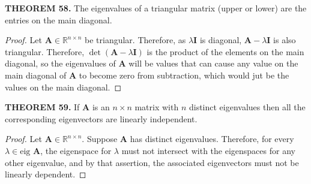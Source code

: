 \documentclass[12pt]{article}
\newcommand{\mat}[1]{\mathbf{#1}}
\newcommand{\theorem}[2]{\textbf{THEOREM #1.} #2}
\newcommand{\eig}{\text{eig }}
\begin{document}
\theorem{58}{The eigenvalues of a triangular matrix (upper or lower) are the entries on the main diagonal.}

\begin{proof}
Let $\mat{A} \in \mathbb{R}^{n \times n}$ be triangular. Therefore, as $\lambda \mat{I}$ is diagonal, $\mat{A} - \lambda \mat{I}$ is also triangular. Therefore, $\det(\mat{A} - \lambda \mat{I})$ is the product of the elements on the main diagonal, so the eigenvalues of $\mat{A}$ will be values that can cause any value on the main diagonal of $\mat{A}$ to become zero from subtraction, which would jut be the values on the main diagonal.   
\end{proof}

\theorem{59}{If $\mat{A}$ is an $n \times n$ matrix with $n$ distinct eigenvalues then all the corresponding eigenvectors are linearly independent.}

\begin{proof}
Let $\mat{A} \in \mathbb{R}^{n \times n}$. Suppose $\mat{A}$ has distinct eigenvalues. Therefore, for every $\lambda \in \eig \mat{A}$, the eigenspace for $\lambda$ must not intersect with the eigenspaces for any other eigenvalue, and by that assertion, the associated eigenvectors must not be linearly dependent.
\end{proof}
\end{document}
